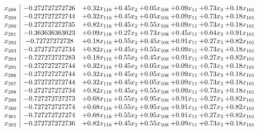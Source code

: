 \documentclass[8pt]{article}
\begin{document}
\[\begin{array}{c| c c@{\hskip 2pt} c@{\hskip 2pt} c@{\hskip 2pt} c@{\hskip 2pt} c@{\hskip 2pt} c@{\hskip 2pt} }
 x_{288}   &  -0.272727272726 & +  0.32 x_{118} & +  0.45 x_{2} & +  0.05 x_{108} & +  0.09 x_{11} & +  0.73 x_{3} & +  0.18 x_{101}\\
 x_{289}   &  -0.272727272744 & +  0.32 x_{118} & +  0.45 x_{2} & +  0.05 x_{108} & +  0.09 x_{11} & +  0.73 x_{3} & +  0.18 x_{101}\\
 x_{290}   &  -0.272727272735 & +  0.82 x_{118} & +  0.45 x_{2} & +  0.55 x_{108} & +  0.09 x_{11} & +  0.73 x_{3} & +  0.18 x_{101}\\
 x_{291}   &  -0.363636363623 & +  0.09 x_{118} & +  0.27 x_{2} & +  0.73 x_{108} & +  0.45 x_{11} & +  0.64 x_{3} & +  0.91 x_{101}\\
 x_{292}   &  -0.72727272728 & +  0.18 x_{118} & +  0.55 x_{2} & +  0.45 x_{108} & +  0.91 x_{11} & +  0.27 x_{3} & +  0.82 x_{101}\\
 x_{293}   &  -0.272727272734 & +  0.82 x_{118} & +  0.45 x_{2} & +  0.55 x_{108} & +  0.09 x_{11} & +  0.73 x_{3} & +  0.18 x_{101}\\
 x_{294}   &  -0.727272727283 & +  0.18 x_{118} & +  0.55 x_{2} & +  0.45 x_{108} & +  0.91 x_{11} & +  0.27 x_{3} & +  0.82 x_{101}\\
 x_{295}   &  -0.272727272744 & +  0.32 x_{118} & +  0.45 x_{2} & +  0.05 x_{108} & +  0.09 x_{11} & +  0.73 x_{3} & +  0.18 x_{101}\\
 x_{296}   &  -0.272727272744 & +  0.32 x_{118} & +  0.45 x_{2} & +  0.05 x_{108} & +  0.09 x_{11} & +  0.73 x_{3} & +  0.18 x_{101}\\
 x_{297}   &  -0.272727272744 & +  0.32 x_{118} & +  0.45 x_{2} & +  0.05 x_{108} & +  0.09 x_{11} & +  0.73 x_{3} & +  0.18 x_{101}\\
 x_{298}   &  -0.272727272734 & +  0.82 x_{118} & +  0.45 x_{2} & +  0.55 x_{108} & +  0.09 x_{11} & +  0.73 x_{3} & +  0.18 x_{101}\\
 x_{299}   &  -0.727272727273 & +  0.68 x_{118} & +  0.55 x_{2} & +  0.95 x_{108} & +  0.91 x_{11} & +  0.27 x_{3} & +  0.82 x_{101}\\
 x_{300}   &  -0.727272727274 & +  0.68 x_{118} & +  0.55 x_{2} & +  0.95 x_{108} & +  0.91 x_{11} & +  0.27 x_{3} & +  0.82 x_{101}\\
 x_{301}   &  -0.727272727274 & +  0.68 x_{118} & +  0.55 x_{2} & +  0.95 x_{108} & +  0.91 x_{11} & +  0.27 x_{3} & +  0.82 x_{101}\\
 x_{302}   &  -0.272727272736 & +  0.82 x_{118} & +  0.45 x_{2} & +  0.55 x_{108} & +  0.09 x_{11} & +  0.73 x_{3} & +  0.18 x_{101}\\

\end{array}\]
\end{document}
